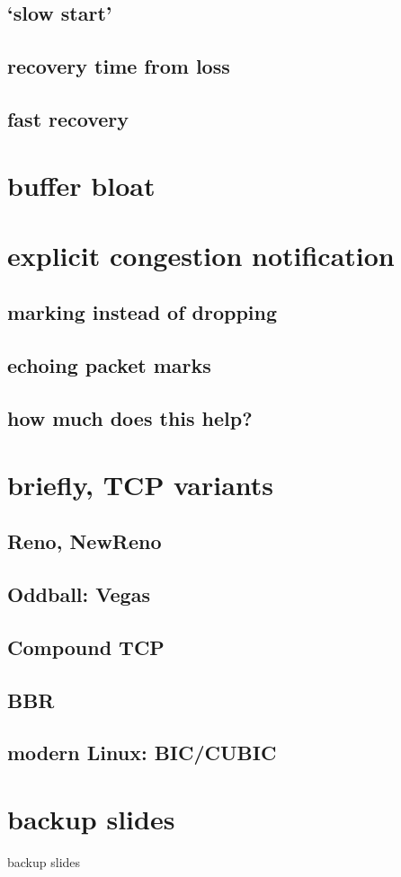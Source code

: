 \subsection{`slow start'}

\subsection{recovery time from loss}

\subsection{fast recovery}

\section{buffer bloat}


\section{explicit congestion notification}

\subsection{marking instead of dropping}

\subsection{echoing packet marks}

\subsection{how much does this help?}

\section{briefly, TCP variants}

\subsection{Reno, NewReno}

\subsection{Oddball: Vegas}

\subsection{Compound TCP}

\subsection{BBR}

\subsection{modern Linux: BIC/CUBIC}


\section{backup slides}
\begin{frame}{backup slides}
\end{frame}


